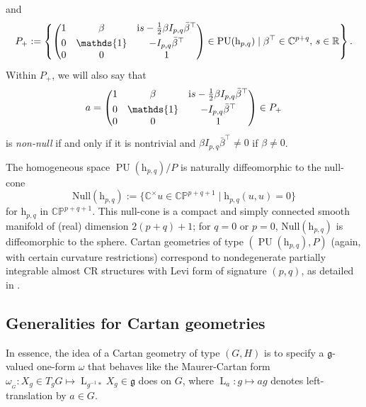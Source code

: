 \documentclass[10pt,a4paper]{amsart}
\numberwithin{equation}{section}
\theoremstyle{definition}
\DeclareMathOperator{\PU}{\mathrm{PU}}
\newcommand{\MC}[1]{\omega_{{}_{#1}}}
\newcommand{\Lt}[1]{\operatorname{L}_{#1}}
\begin{document}
and
\[P_+:=\left\{\begin{pmatrix}1 & \beta & \mathrm{i}s-\tfrac{1}{2}\beta I_{p,q} \bar{\beta}^\top \vspace{1mm}\\ 0 & \mathds{1} & -I_{p,q}\bar{\beta}^\top \\ 0 & 0 & 1\end{pmatrix}\in\PU(\mathrm{h}_{p,q})\mid \beta^\top\in\mathbb{C}^{p+q},\, s\in\mathbb{R}\right\}.\]
Within $P_+$, we will also say that \[a=\begin{pmatrix}1 & \beta & \mathrm{i}s-\tfrac{1}{2}\beta I_{p,q} \bar{\beta}^\top \vspace{1mm}\\ 0 & \mathds{1} & -I_{p,q}\bar{\beta}^\top \\ 0 & 0 & 1\end{pmatrix}\in P_+\] is \emph{non-null} if and only if it is nontrivial and $\beta I_{p,q}\bar{\beta}^\top\neq 0$ if $\beta\neq 0$.

The homogeneous space $\PU(\mathrm{h}_{p,q})/P$ is naturally diffeomorphic to the null-cone \[\mathrm{Null}(\mathrm{h}_{p,q}):=\bigl\{\mathbb{C}^\times u\in\mathbb{CP}^{p+q+1}\mid \mathrm{h}_{p,q}(u,u)=0\bigr\}\] for $\mathrm{h}_{p,q}$ in $\mathbb{CP}^{p+q+1}$. This null-cone is a compact and simply connected smooth manifold of (real) dimension $2(p+q)+1$; for $q=0$ or $p=0$, $\mathrm{Null}(\mathrm{h}_{p,q})$ is diffeomorphic to the sphere. Cartan geometries of type $(\PU(\mathrm{h}_{p,q}),P)$ (again, with certain curvature restrictions) correspond to nondegenerate partially integrable almost CR structures with Levi form of signature $(p,q)$, as detailed in \cite[Section~4.2.4]{CapSlovakPG1}.

\subsection{Generalities for Cartan geometries}
In essence, the idea of a Cartan geometry of type $(G,H)$ is to specify a $\mathfrak{g}$-valued one-form $\omega$ that behaves like the Maurer-Cartan form $\MC{G}\colon X_g\in T_g G\mapsto\Lt{g^{-1}*}X_g\in\mathfrak{g}$ does on $G$, where $\Lt{a}\colon g\mapsto ag$ denotes left-translation by $a\in G$.
\end{document}

